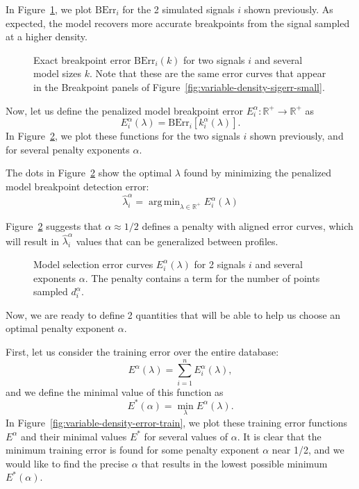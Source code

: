 \documentclass{jsfds} %
\newcommand{\fig}[3][H]{
  \begin{figure}[#1]
    \hskip -1cm
    
    \caption{#3}
    \label{fig:#2}
  \end{figure}
}
\DeclareMathOperator*{\argmin}{arg\,min}
\newcommand{\RR}{\mathbb{R}}
\begin{document}
In Figure~\ref{fig:variable-density-berr-k}, we plot $\text{BErr}_i$
for the 2 simulated signals $i$ shown previously.  As expected, the
model recovers more accurate breakpoints from the signal sampled at a
higher density.  

\fig{variable-density-berr-k}{Exact breakpoint error
  $\text{BErr}_i(k)$ for two signals $i$ and several model
  sizes $k$. Note that these are the same error curves that appear
in the Breakpoint panels of Figure~\ref{fig:variable-density-sigerr-small}.}

\newpage

Now, let us define the penalized
model breakpoint error $E^\alpha_i:\RR^+\rightarrow\RR^+$ as
\begin{equation}
  \label{eq:lerr}
E^\alpha_i(\lambda) = \text{BErr}_i\left[
k^\alpha_i(\lambda)
\right].
\end{equation}
In Figure~\ref{fig:variable-density-berr}, we plot these functions for the
two signals $i$ shown previously, and for several penalty exponents $\alpha$.

The dots in Figure~\ref{fig:variable-density-berr} show the optimal
$\lambda$ found by minimizing the penalized model breakpoint detection
error:
\begin{equation}
  \label{eq:lambda_hat}
  \hat \lambda^\alpha_i = \argmin_{\lambda\in\RR^+}  E^\alpha_i(\lambda)
\end{equation}

Figure~\ref{fig:variable-density-berr} suggests that $\alpha\approx1/2$
defines a penalty with aligned error curves, which will result in
$\hat \lambda_i^\alpha$ values that can be generalized between
profiles. 

\fig{variable-density-berr}{Model selection error curves
  $E_i^\alpha(\lambda)$ for 2 signals $i$ and several exponents
  $\alpha$. The penalty contains a term for the number of points sampled $d_i^\alpha$.}

\newpage

Now, we are ready to define 2 quantities that will be able to help us
choose an optimal penalty exponent $\alpha$.

First, let us consider the training error over the entire database:
\begin{equation}
  \label{eq:lerr_train}
  E^\alpha(\lambda) = \sum_{i=1}^n E_i^\alpha(\lambda),
\end{equation}
and we define the minimal value of this function as
\begin{equation}
  \label{eq:lerr_train_min}
  E^*(\alpha) = \min_\lambda E^\alpha(\lambda).
\end{equation}
In Figure~\ref{fig:variable-density-error-train}, we plot these
training error functions $E^\alpha$ and their minimal values $E^*$ for
several values of $\alpha$. It is clear that the minimum training
error is found for some penalty exponent $\alpha$ near 1/2, and we
would like to find the precise $\alpha$ that results in the lowest
possible minimum $E^*(\alpha)$.
\end{document}
